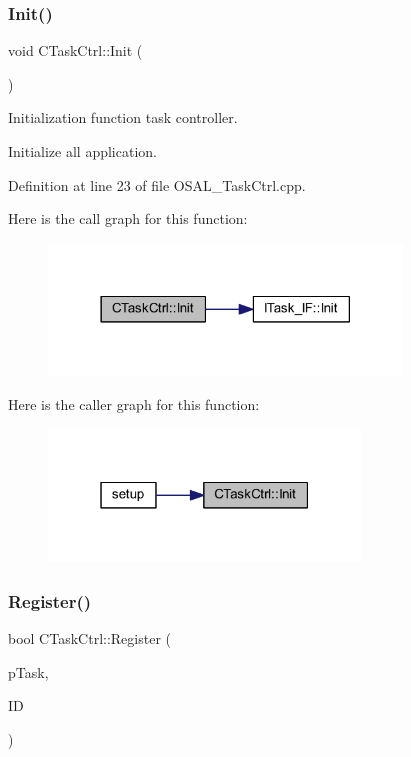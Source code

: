 \subsubsection{\texorpdfstring{Init()}{Init()}}
{\footnotesize\ttfamily void C\+Task\+Ctrl\+::\+Init (\begin{DoxyParamCaption}\item[{void}]{ }\end{DoxyParamCaption})}



Initialization function task controller. 

Initialize all application. 

Definition at line 23 of file O\+S\+A\+L\+\_\+\+Task\+Ctrl.\+cpp.

Here is the call graph for this function\+:\nopagebreak
\begin{figure}[H]
\begin{center}
\leavevmode
\includegraphics[width=266pt]{class_c_task_ctrl_a12ec6e8d4a490eba9ebdf22d32cf292b_cgraph}
\end{center}
\end{figure}
Here is the caller graph for this function\+:\nopagebreak
\begin{figure}[H]
\begin{center}
\leavevmode
\includegraphics[width=235pt]{class_c_task_ctrl_a12ec6e8d4a490eba9ebdf22d32cf292b_icgraph}
\end{center}
\end{figure}
\mbox{\label{class_c_task_ctrl_a20457bd4d4a033c8aeeb44e9d4dc3c7c}} 
\subsubsection{\texorpdfstring{Register()}{Register()}}
{\footnotesize\ttfamily bool C\+Task\+Ctrl\+::\+Register (\begin{DoxyParamCaption}\item[{\mbox{\hyperlink{class_i_task___i_f}{I\+Task\+\_\+\+IF}} $\ast$}]{p\+Task,  }\item[{\mbox{\hyperlink{_a_d_a_s___types_8h_aba7bc1797add20fe3efdf37ced1182c5}{uint8\+\_\+t}}}]{ID }\end{DoxyParamCaption})}



